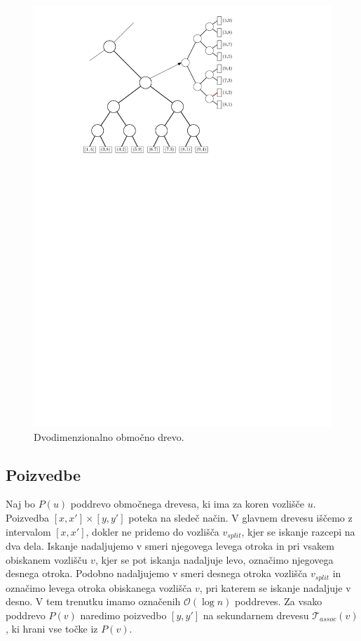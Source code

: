 \documentclass[a4paper, 12pt]{book}
\newcommand{\T}{\ensuremath{\mathcal{T}}}
\newcommand{\OO}{\ensuremath{\mathcal{O}}} %
\begin{document}
\begin{figure}[htp]
\centerline{\includegraphics[scale=1]{pics/rangeTree2.pdf}}
\caption{Dvodimenzionalno območno drevo.}
\label{range-primer}
\end{figure}

\subsection{Poizvedbe}
Naj bo $P(u)$ poddrevo območnega drevesa, ki ima za koren vozlišče $u$. Poizvedba $[x,x'] \times [y,y']$ poteka na sledeč način. V glavnem drevesu iščemo z intervalom $[x,x']$, dokler ne pridemo do vozlišča $v_{split}$, kjer se iskanje razcepi na dva dela. Iskanje nadaljujemo v smeri njegovega levega otroka in pri vsakem obiskanem vozlišču $v$, kjer se pot iskanja nadaljuje levo, označimo njegovega desnega otroka. Podobno nadaljujemo v smeri desnega otroka vozlišča $v_{split}$ in označimo levega otroka obiskanega vozlišča $v$, pri katerem se iskanje nadaljuje v desno. 
V tem trenutku imamo označenih $\OO(\log n)$ poddreves. Za vsako poddrevo $P(v)$ naredimo poizvedbo $[y,y']$ na sekundarnem drevesu $\T_{assoc}(v)$, ki hrani vse točke iz $P(v)$. 
\end{document}
